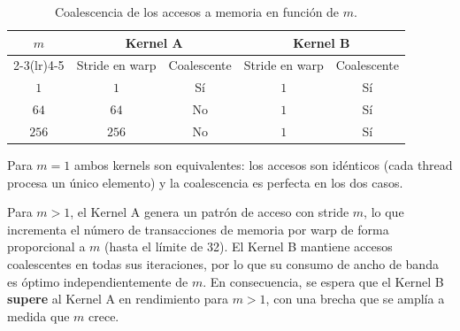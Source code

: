 \documentclass[12pt]{article}
\newenvironment{exercise}[2][Ejercicio]{\begin{trivlist}
\item[\hskip \labelsep {\bfseries #1}\hskip \labelsep {\bfseries #2.}]}{\end{trivlist}}
\begin{document}
\begin{exercise}{2}
    \begin{table}[h]
        \centering
        \begin{tabular}{ccccc}
            \toprule
            $m$   & \multicolumn{2}{c}{\textbf{Kernel A}} & \multicolumn{2}{c}{\textbf{Kernel B}}                                \\
            \cmidrule(lr){2-3}\cmidrule(lr){4-5}
                  & Stride en warp                        & Coalescente                           & Stride en warp & Coalescente \\
            \midrule
            $1$   & $1$                                   & Sí                                    & $1$            & Sí          \\
            $64$  & $64$                                  & No                                    & $1$            & Sí          \\
            $256$ & $256$                                 & No                                    & $1$            & Sí          \\
            \bottomrule
        \end{tabular}
        \caption{Coalescencia de los accesos a memoria en función de $m$.}
        \label{tab:coalescencia}
    \end{table}

    Para $m = 1$ ambos kernels son equivalentes: los accesos son idénticos (cada thread procesa
    un único elemento) y la coalescencia es perfecta en los dos casos.

    Para $m > 1$, el Kernel A genera un patrón de acceso con stride $m$, lo que incrementa el número
    de transacciones de memoria por warp de forma proporcional a $m$ (hasta el límite de 32). El
    Kernel B mantiene accesos coalescentes en todas sus iteraciones, por lo que su consumo de ancho
    de banda es óptimo independientemente de $m$. En consecuencia, se espera que el Kernel B
    \textbf{supere} al Kernel A en rendimiento para $m > 1$, con una brecha que se amplía a medida
    que $m$ crece.
\end{exercise}
\end{document}
